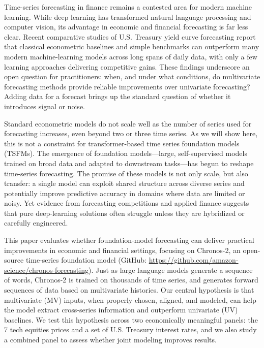 \documentclass[twocolumn]{article}
\begin{document}
Time-series forecasting in finance remains a contested area for modern machine learning. While deep learning has transformed natural language processing and computer vision, its advantage in economic and financial forecasting is far less clear. Recent comparative studies of U.S. Treasury yield curve forecasting report that classical econometric baselines and simple benchmarks can outperform many modern machine-learning models across long spans of daily data, with only a few learning approaches delivering competitive gains. These findings underscore an open question for practitioners: when, and under what conditions, do multivariate forecasting methods provide reliable improvements over univariate forecasting? Adding data for a forecast brings up the standard question of whether it introduces signal or noise.

Standard econometric models do not scale well as the number of series used for forecasting increases, even beyond two or three time series. As we will show here, this is not a constraint for transformer-based time series foundation models (TSFMs). The emergence of foundation models---large, self-supervised models trained on broad data and adapted to downstream tasks---has begun to reshape time-series forecasting. The promise of these models is not only scale, but also transfer: a single model can exploit shared structure across diverse series and potentially improve predictive accuracy in domains where data are limited or noisy. Yet evidence from forecasting competitions and applied finance \citep{singh_yield_2025} suggests that pure deep-learning solutions often struggle unless they are hybridized or carefully engineered.

This paper evaluates whether foundation-model forecasting can deliver practical improvements in economic and financial settings, focusing on Chronos-2, an open-source time-series foundation model (GitHub: \url{https://github.com/amazon-science/chronos-forecasting}). Just as large language models generate a sequence of words, Chronos-2 is trained on thousands of time series, and generates forward sequences of data based on multivariate histories. Our central hypothesis is that multivariate (MV) inputs, when properly chosen, aligned, and modeled, can help the model extract cross-series information and outperform univariate (UV) baselines. We test this hypothesis across two economically meaningful panels: the 7 tech equities prices and a set of U.S. Treasury interest rates, and we also study a combined panel to assess whether joint modeling improves results.
\end{document}
